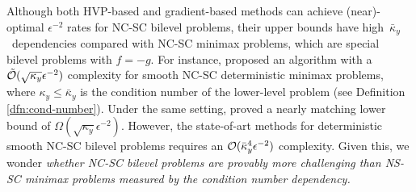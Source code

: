 \documentclass{article}
\begin{document}
Although both HVP-based and gradient-based methods can achieve (near)-optimal $\epsilon^{-2}$ rates for NC-SC bilevel problems, their upper bounds have high~$\bar \kappa_y$~dependencies compared with 
NC-SC minimax problems, which are special bilevel problems with $f = -g$. For instance, 
\citet{lin2020near} proposed an algorithm with a $\tilde {{\mathcal{O}}}(\sqrt{\kappa_y} \epsilon^{-2})$ complexity for smooth NC-SC 
deterministic minimax problems, where $\kappa_y \le \bar \kappa_y$ is the condition number of the lower-level problem (see Definition \ref{dfn:cond-number}). Under the same setting,
\citet{li2021complexity,zhang2021complexity} proved a nearly matching lower bound of $\Omega(\sqrt{\kappa_y} \epsilon^{-2})$.
However, the state-of-art methods 
for deterministic smooth NC-SC bilevel problems requires an ${\mathcal{O}}(\bar \kappa_y^4 \epsilon^{-2})$ complexity.
Given this, we wonder  \textit{whether NC-SC bilevel problems are provably more challenging than NS-SC minimax problems measured by the condition number dependency.}
   
\end{document}
